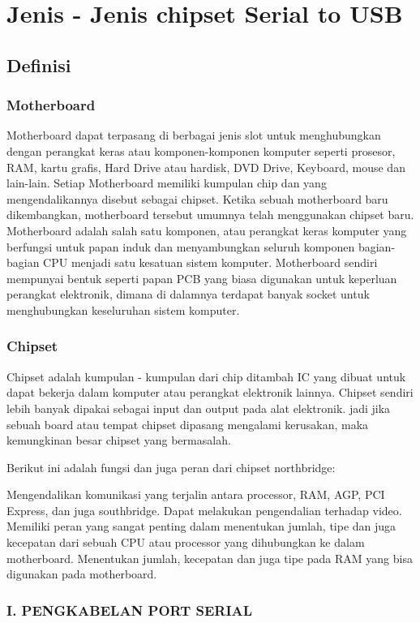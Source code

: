 \section{Jenis - Jenis chipset Serial to USB}
\subsection{Definisi}
\subsubsection{Motherboard}
Motherboard dapat  terpasang di berbagai jenis slot untuk menghubungkan dengan perangkat keras atau komponen-komponen komputer seperti prosesor, RAM, kartu grafis, Hard Drive atau hardisk, DVD Drive, Keyboard, mouse dan lain-lain. Setiap Motherboard memiliki kumpulan chip dan yang mengendalikannya disebut sebagai chipset. Ketika sebuah motherboard baru dikembangkan, motherboard tersebut umumnya telah menggunakan chipset baru. Motherboard adalah salah satu komponen, atau perangkat keras komputer yang berfungsi  untuk papan induk dan menyambungkan seluruh komponen bagian-bagian CPU menjadi satu kesatuan sistem komputer. Motherboard sendiri  mempunyai  bentuk seperti  papan PCB yang biasa digunakan untuk keperluan perangkat elektronik, dimana di dalamnya terdapat banyak socket untuk menghubungkan keseluruhan sistem komputer.
\subsubsection{Chipset}
Chipset adalah kumpulan - kumpulan dari chip ditambah IC yang dibuat untuk dapat bekerja dalam komputer atau perangkat elektronik lainnya.
Chipset sendiri lebih banyak dipakai sebagai input dan output pada alat elektronik. jadi jika sebuah board atau tempat chipset dipasang mengalami kerusakan, maka kemungkinan besar chipset yang bermasalah.

Berikut ini adalah fungsi dan juga peran dari chipset northbridge:

Mengendalikan komunikasi yang terjalin antara processor, RAM, AGP, PCI Express, dan juga southbridge.
Dapat melakukan pengendalian terhadap video.
Memiliki peran yang sangat penting dalam menentukan jumlah, tipe dan juga kecepatan dari sebuah CPU atau processor yang dihubungkan ke dalam motherboard.
Menentukan jumlah, kecepatan dan juga tipe pada RAM yang bisa digunakan pada motherboard.

\subsubsection{I. PENGKABELAN PORT SERIAL}

